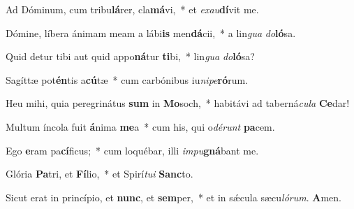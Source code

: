\item Ad Dóminum, cum tribu\textbf{lá}rer, cla\textbf{má}vi,~* et \textit{exau}\textbf{dí}vit me.

\item Dómine, líbera ánimam meam a lábi\textbf{is} men\textbf{dá}cii,~* a lin\textit{gua} \textit{do}\textbf{ló}sa.

\item Quid detur tibi aut quid appo\textbf{ná}tur \textbf{ti}bi,~* lin\textit{gua} \textit{do}\textbf{ló}sa?

\item Sagíttæ pot\textbf{én}tis a\textbf{cú}tæ~* cum carbónibus iu\textit{nipe}\textbf{ró}rum.

\item Heu mihi, quia peregrinátus \textbf{sum} in \textbf{Mo}soch,~* habitávi ad taberná\textit{cula} \textbf{Ce}dar!

\item Multum íncola fuit \textbf{á}nima \textbf{me}a~* cum his, qui o\textit{dérunt} \textbf{pa}cem.

\item Ego \textbf{e}ram pa\textbf{cí}ficus;~* cum loquébar, illi \textit{impu}\textbf{gná}bant me.

\item Glória \textbf{Pa}tri, et \textbf{Fí}lio,~* et Spirí\textit{tui} \textbf{Sanc}to.

\item Sicut erat in princípio, et \textbf{nunc}, et \textbf{sem}per,~* et in sǽcula sæcu\textit{lórum}. \textbf{A}men.